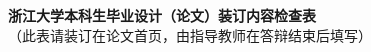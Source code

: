 \thispagestyle{empty}
\setcounter{page}{-1}

\vskip 25mm

\begin{center}
  {\heiti\bfseries{} 浙江大学本科生毕业设计（论文）装订内容检查表} \\
  \songti{} （此表请装订在论文首页，由指导教师在答辩结束后填写）
\end{center}

\eethesischecklistinfo[教师职称][分数]

\vskip 15mm

\eethesischecklist

\vskip 20mm

